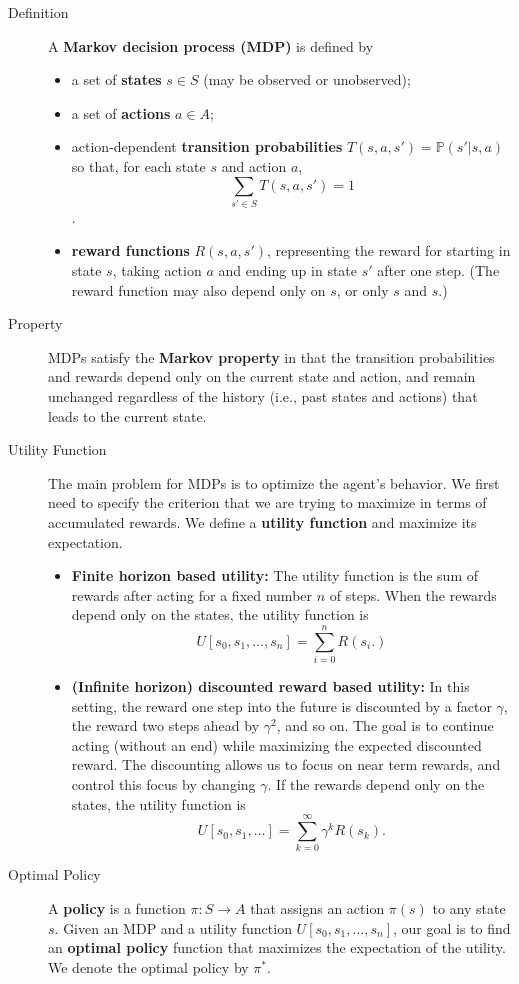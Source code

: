 \documentclass[10pt,landscape,a4paper]{article}
\begin{document}
\begin{multicols*}{3}
\begin{description}
	\item[Definition] A {\bf Markov decision process (MDP)} is defined by
	\begin{itemize}
		\item a set of {\bf states} $s\in S$ (may be observed or unobserved);
		\item a set of {\bf actions} $a\in A$;
		\item action-dependent {\bf transition probabilities} $T(s,a,s')=\mathbb{P}(s'|s,a)$ so that, for each state $s$ and action $a$,
		$$\sum_{s'\in S}T(s,a,s')=1$$.
		\item {\bf reward functions} $R(s,a,s')$, representing the reward for starting in state $s$, taking action $a$ and ending up in state $s'$ after one step. (The reward function may also depend only on $s$, or only $s$ and $s$.)
	\end{itemize}
	\item[Property] MDPs satisfy the {\bf Markov property} in that the transition probabilities and rewards depend only on the current state and action, and remain unchanged regardless of the history (i.e., past states and actions) that leads to the current state.
	\item[Utility Function] The main problem for MDPs is to optimize the agent's behavior. We first need to specify the criterion that we are trying to maximize in terms of accumulated rewards. We define a {\bf utility function} and maximize its expectation.
	\begin{itemize}
		\item {\bf Finite horizon based utility:} The utility function is the sum of rewards after acting for a fixed number $n$ of steps. When the rewards depend only on the states, the utility function is
		$$U[s_0,s_1,\dots,s_n]=\sum_{i=0}^{n}R(s_i.)$$
		\item {\bf (Infinite horizon) discounted reward based utility:} In this setting, the reward one step into the future is discounted by a factor $\gamma$, the reward two steps ahead by $\gamma^2$, and so on. The goal is to continue acting (without an end) while maximizing the expected discounted reward. The discounting allows us to focus on near term rewards, and control this focus by changing $\gamma$. If the rewards depend only on the states, the utility function is
		$$U[s_0,s_1,\dots]=\sum_{k=0}^{\infty}\gamma^kR(s_k).$$ 
	\end{itemize}
	\item[Optimal Policy] A {\bf policy} is a function $\pi:S\rightarrow A$ that assigns an action $\pi(s)$ to any state $s$. Given an MDP and a utility function $U[s_0,s_1,\dots,s_n]$, our goal is to find an {\bf optimal policy} function that maximizes the expectation of the utility. We denote the optimal policy by $\pi^*$.
\end{description}


\end{multicols*}
\end{document}
